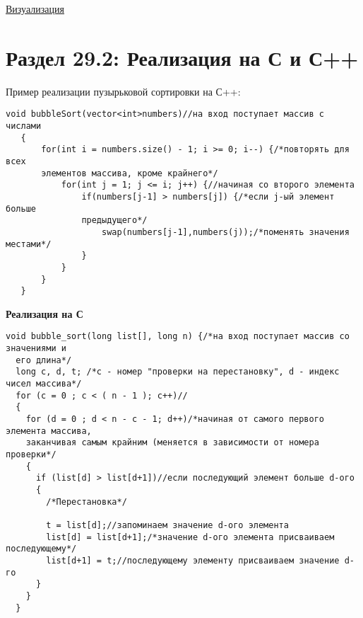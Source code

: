 \vspace{\baselineskip}

\href{http://i.stack.imgur.com/NJPXP.gif}{\underline{Визуализация}}

\section*{Раздел 29.2: Реализация на С и С++}

Пример реализации пузырьковой сортировки на С++:

\vspace{\baselineskip}

\begin{tcolorbox} 
\begin{verbatim}
void bubbleSort(vector<int>numbers)//на вход поступает массив с числами
   {
       for(int i = numbers.size() - 1; i >= 0; i--) {/*повторять для всех 
       элементов массива, кроме крайнего*/
           for(int j = 1; j <= i; j++) {//начиная со второго элемента
               if(numbers[j-1] > numbers[j]) {/*если j-ый элемент больше 
               предыдущего*/
                   swap(numbers[j-1],numbers(j));/*поменять значения местами*/
               }
           }
       }
   }
\end{verbatim}
\end{tcolorbox}

\vspace{\baselineskip}

\textbf{Реализация на С} 

\vspace{\baselineskip}

\begin{tcolorbox} 
\begin{verbatim}
void bubble_sort(long list[], long n) {/*на вход поступает массив со значениями и 
  его длина*/
  long c, d, t; /*с - номер "проверки на перестановку", d - индекс чисел массива*/
  for (c = 0 ; c < ( n - 1 ); c++)//
  {
    for (d = 0 ; d < n - c - 1; d++)/*начиная от самого первого элемента массива,
    заканчивая самым крайним (меняется в зависимости от номера проверки*/
    {
      if (list[d] > list[d+1])//если последующий элемент больше d-ого
      {
        /*Перестановка*/
 
        t = list[d];//запоминаем значение d-ого элемента
        list[d] = list[d+1];/*значение d-ого элемента присваиваем последующему*/
        list[d+1] = t;//последующему элементу присваиваем значение d-го
      }
    }
  }
\end{verbatim}
\end{tcolorbox}

